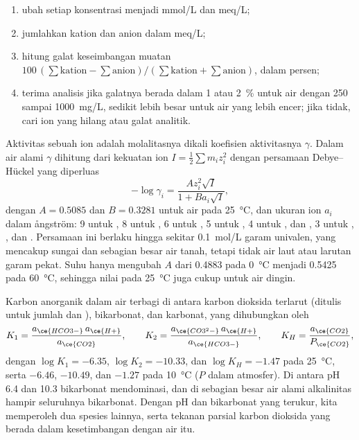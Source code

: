 \begin{method}\label{met:b3:water-rock-interaction:analysis}
\begin{enumerate}
\item ubah setiap konsentrasi menjadi \unit{mmol/L} dan \unit{meq/L};
\item jumlahkan kation dan anion dalam \unit{meq/L};
\item hitung galat keseimbangan muatan $100\,(\sum\text{kation} -
  \sum\text{anion})/(\sum\text{kation} + \sum\text{anion})$, dalam persen;
\item terima analisis jika galatnya berada dalam 1 atau \qty{2}{\percent} untuk
  air dengan 250 sampai \qty{1000}{mg/L}, sedikit lebih besar untuk air yang
  lebih encer; jika tidak, cari ion yang hilang atau galat analitik.
\end{enumerate}
\end{method}

Aktivitas sebuah ion adalah molalitasnya dikali koefisien aktivitasnya
$\gamma$. Dalam air alami $\gamma$ dihitung dari kekuatan ion $I =
\tfrac12\sum m_i z_i^2$ dengan persamaan Debye--Hückel yang diperluas
\[
-\log\gamma_i = \frac{A z_i^2\sqrt I}{1 + B a_i\sqrt I},
\]
dengan $A = 0.5085$ dan $B = 0.3281$ untuk air pada \qty{25}{\celsius}, dan
ukuran ion $a_i$ dalam ångström: 9 untuk , 8 untuk , 6 untuk
, 5 untuk , 4 untuk ,  dan ,
3 untuk , ,  dan . Persamaan ini berlaku hingga
sekitar \qty{0.1}{mol/L} garam univalen, yang mencakup sungai dan sebagian besar
air tanah, tetapi tidak air laut atau larutan garam pekat. Suhu hanya mengubah
$A$ dari 0.4883 pada \qty{0}{\celsius} menjadi 0.5425 pada \qty{60}{\celsius},
sehingga nilai pada \qty{25}{\celsius} juga cukup untuk air dingin.

Karbon anorganik dalam air terbagi di antara karbon dioksida terlarut
(ditulis  untuk jumlah  dan ), bikarbonat, dan
karbonat, yang dihubungkan oleh
\[
K_1 = \frac{a_{\ce{HCO3-}}\,a_{\ce{H+}}}{a_{\ce{CO2}}}, \qquad
K_2 = \frac{a_{\ce{CO3^2-}}\,a_{\ce{H+}}}{a_{\ce{HCO3-}}}, \qquad
K_H = \frac{a_{\ce{CO2}}}{P_{\ce{CO2}}},
\]
dengan $\log K_1 = -6.35$, $\log K_2 = -10.33$, dan $\log K_H = -1.47$ pada
\qty{25}{\celsius}, serta $-6.46$, $-10.49$, dan $-1.27$ pada \qty{10}{\celsius}
($P$ dalam atmosfer). Di antara pH 6.4 dan 10.3 bikarbonat mendominasi, dan
di sebagian besar air alami alkalinitas hampir seluruhnya bikarbonat. Dengan pH
dan bikarbonat yang terukur, kita memperoleh dua spesies lainnya, serta tekanan
parsial karbon dioksida yang berada dalam kesetimbangan dengan air itu.

